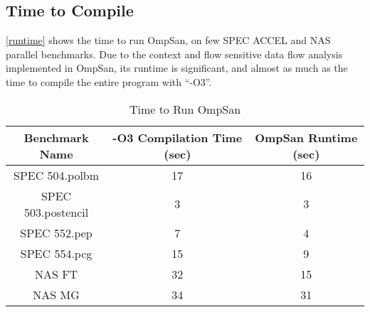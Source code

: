 \subsection{Time to Compile}
\autoref{runtime} shows the time to run OmpSan, on few SPEC ACCEL and 
NAS parallel benchmarks. 
Due to the context and flow sensitive data flow analysis implemented in 
OmpSan, its runtime is significant, and almost as much as the 
time to compile the entire program with ``-O3''. 
\begin{table} \vspace{-30pt}
    \caption{Time to Run OmpSan}
    \label{runtime}
    \begin{center}
        \scriptsize
        \begin{tabular}{ | c | c | c |}
            \hline
           Benchmark Name &  -O3 Compilation Time (sec)
           & OmpSan Runtime (sec) \\ \hline    
           SPEC 504.polbm & 17 & 16 \\ \hline    
           SPEC 503.postencil & 3 & 3 \\ \hline    
           SPEC 552.pep  & 7 & 4 \\ \hline    
           SPEC 554.pcg & 15 & 9\\ \hline    
           NAS FT & 32 & 15 \\ \hline    
           NAS MG & 34 & 31              \\ \hline                       
        \end{tabular}        
    \end{center}
\end{table}\vspace{-30pt}
